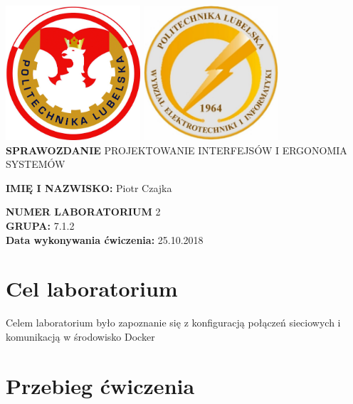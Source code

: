 \documentclass[12pt]{article}
\begin{document}
    \centering
    \includegraphics[width=5cm, height=5cm,]{herbPL.jpg}
    \hspace{2cm}
    \includegraphics[width=5cm, height=5cm]{herbWEII.jpg}\\
    \vspace{2cm}
    {\Huge \textbf{SPRAWOZDANIE}}
    \vspace{2cm}
    \newline
    {\large PROJEKTOWANIE INTERFEJSÓW I ERGONOMIA SYSTEMÓW}
    \vfill
    \raggedright
    \textbf{IMIĘ I NAZWISKO:} Piotr Czajka

    \textbf{NUMER LABORATORIUM} 2\\
    \textbf{GRUPA:} 7.1.2\\
    \textbf{Data wykonywania ćwiczenia:} 25.10.2018\\

    \newpage

    \tableofcontents{}

    \newpage

    \section{Cel laboratorium}
    Celem laboratorium było zapoznanie się z konfiguracją połączeń sieciowych i komunikacją w środowisko Docker\\

    \section{Przebieg ćwiczenia}
\end{document}
